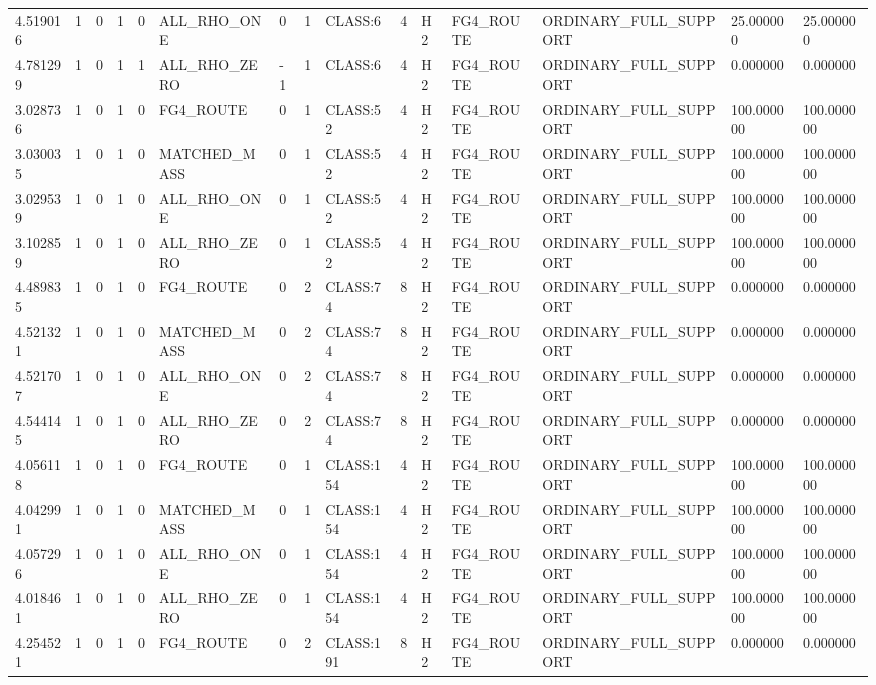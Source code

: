 \begin{tabular}{lllllllllllllll}
4.519016 & 1 & 0 & 1 & 0 & ALL\_RHO\_ONE & 0 & 1 & CLASS:6 & 4 & H2 & FG4\_ROUTE & ORDINARY\_FULL\_SUPPORT & 25.000000 & 25.000000 \\
4.781299 & 1 & 0 & 1 & 1 & ALL\_RHO\_ZERO & -1 & 1 & CLASS:6 & 4 & H2 & FG4\_ROUTE & ORDINARY\_FULL\_SUPPORT & 0.000000 & 0.000000 \\
3.028736 & 1 & 0 & 1 & 0 & FG4\_ROUTE & 0 & 1 & CLASS:52 & 4 & H2 & FG4\_ROUTE & ORDINARY\_FULL\_SUPPORT & 100.000000 & 100.000000 \\
3.030035 & 1 & 0 & 1 & 0 & MATCHED\_MASS & 0 & 1 & CLASS:52 & 4 & H2 & FG4\_ROUTE & ORDINARY\_FULL\_SUPPORT & 100.000000 & 100.000000 \\
3.029539 & 1 & 0 & 1 & 0 & ALL\_RHO\_ONE & 0 & 1 & CLASS:52 & 4 & H2 & FG4\_ROUTE & ORDINARY\_FULL\_SUPPORT & 100.000000 & 100.000000 \\
3.102859 & 1 & 0 & 1 & 0 & ALL\_RHO\_ZERO & 0 & 1 & CLASS:52 & 4 & H2 & FG4\_ROUTE & ORDINARY\_FULL\_SUPPORT & 100.000000 & 100.000000 \\
4.489835 & 1 & 0 & 1 & 0 & FG4\_ROUTE & 0 & 2 & CLASS:74 & 8 & H2 & FG4\_ROUTE & ORDINARY\_FULL\_SUPPORT & 0.000000 & 0.000000 \\
4.521321 & 1 & 0 & 1 & 0 & MATCHED\_MASS & 0 & 2 & CLASS:74 & 8 & H2 & FG4\_ROUTE & ORDINARY\_FULL\_SUPPORT & 0.000000 & 0.000000 \\
4.521707 & 1 & 0 & 1 & 0 & ALL\_RHO\_ONE & 0 & 2 & CLASS:74 & 8 & H2 & FG4\_ROUTE & ORDINARY\_FULL\_SUPPORT & 0.000000 & 0.000000 \\
4.544145 & 1 & 0 & 1 & 0 & ALL\_RHO\_ZERO & 0 & 2 & CLASS:74 & 8 & H2 & FG4\_ROUTE & ORDINARY\_FULL\_SUPPORT & 0.000000 & 0.000000 \\
4.056118 & 1 & 0 & 1 & 0 & FG4\_ROUTE & 0 & 1 & CLASS:154 & 4 & H2 & FG4\_ROUTE & ORDINARY\_FULL\_SUPPORT & 100.000000 & 100.000000 \\
4.042991 & 1 & 0 & 1 & 0 & MATCHED\_MASS & 0 & 1 & CLASS:154 & 4 & H2 & FG4\_ROUTE & ORDINARY\_FULL\_SUPPORT & 100.000000 & 100.000000 \\
4.057296 & 1 & 0 & 1 & 0 & ALL\_RHO\_ONE & 0 & 1 & CLASS:154 & 4 & H2 & FG4\_ROUTE & ORDINARY\_FULL\_SUPPORT & 100.000000 & 100.000000 \\
4.018461 & 1 & 0 & 1 & 0 & ALL\_RHO\_ZERO & 0 & 1 & CLASS:154 & 4 & H2 & FG4\_ROUTE & ORDINARY\_FULL\_SUPPORT & 100.000000 & 100.000000 \\
4.254521 & 1 & 0 & 1 & 0 & FG4\_ROUTE & 0 & 2 & CLASS:191 & 8 & H2 & FG4\_ROUTE & ORDINARY\_FULL\_SUPPORT & 0.000000 & 0.000000 \\

\end{tabular}
